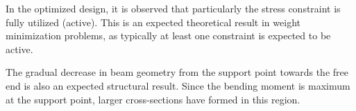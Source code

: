 In the optimized design, it is observed that particularly the stress constraint is fully utilized (active). This is an expected theoretical result in weight minimization problems, as typically at least one constraint is expected to be active.

The gradual decrease in beam geometry from the support point towards the free end is also an expected structural result. Since the bending moment is maximum at the support point, larger cross-sections have formed in this region. 
